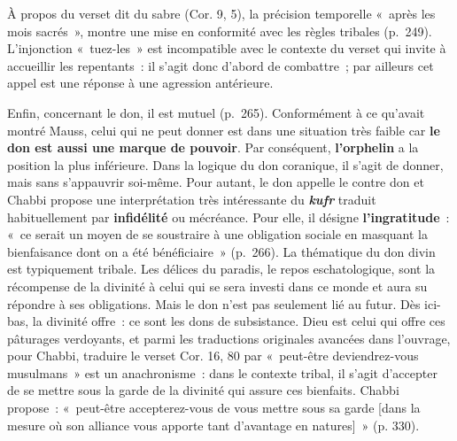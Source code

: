 À propos du verset dit du sabre (Cor. 9, 5), la précision temporelle
«~après les mois sacrés~», montre une mise en conformité avec les règles
tribales (p.~249). L'injonction «~tuez-les~» est incompatible avec le
contexte du verset qui invite à accueillir les repentants~: il s'agit
donc d'abord de combattre~; par ailleurs cet appel est une réponse à une
agression antérieure.


Enfin, concernant le don, il est mutuel (p.~265). Conformément à ce
qu'avait montré Mauss, celui qui ne peut donner est dans une situation
très faible car \textbf{le don est aussi une marque de pouvoir}. Par
conséquent, \textbf{l'orphelin} a la position la plus inférieure. Dans
la logique du don coranique, il s'agit de donner, mais sans s'appauvrir
soi-même. Pour autant, le don appelle le contre don et Chabbi propose
une interprétation très intéressante du \emph{\textbf{kufr}} traduit
habituellement par \textbf{infidélité} ou mécréance. Pour elle, il
désigne \textbf{l'ingratitude}~: «~ce serait un moyen de se soustraire à
une obligation sociale en masquant la bienfaisance dont on a été
bénéficiaire~» (p.~266). La thématique du don divin est typiquement
tribale. Les délices du paradis, le repos eschatologique, sont la
récompense de la divinité à celui qui se sera investi dans ce monde et
aura su répondre à ses obligations. Mais le don n'est pas seulement lié
au futur. Dès ici-bas, la divinité offre~: ce sont les dons de
subsistance. Dieu est celui qui offre ces pâturages verdoyants, et parmi
les traductions originales avancées dans l'ouvrage, pour Chabbi,
traduire le verset Cor. 16, 80 par «~peut-être deviendrez-vous
musulmans~» est un anachronisme~: dans le contexte tribal, il s'agit
d'accepter de se mettre sous la garde de la divinité qui assure ces
bienfaits. Chabbi propose~: «~peut-être accepterez-vous de vous mettre
sous sa garde {[}dans la mesure où son alliance vous apporte tant
d'avantage en natures{]}~» (p. 330).


